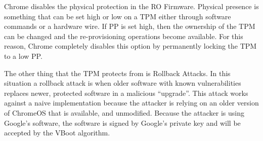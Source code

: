 Chrome disables the physical protection in the RO Firmware.
Physical presence is something that can be set high or low on a TPM either through software commands or a hardware wire. 
If PP is set high, then the ownership of the TPM can be changed and the re-provisioning operations become available.
For this reason, Chrome completely disables this option by permanently locking the TPM to a low PP\@.

The other thing that the TPM protects from is Rollback Attacks.
In this situation a rollback attack is when older software with known vulnerabilities replaces newer, protected software in a malicious ``upgrade''.
This attack works against a naive implementation because the attacker is relying on an older version of ChromeOS that is available, and unmodified.
Because the attacker is using Google's software, the software is signed by Google's private key and will be accepted by the VBoot algorithm.
